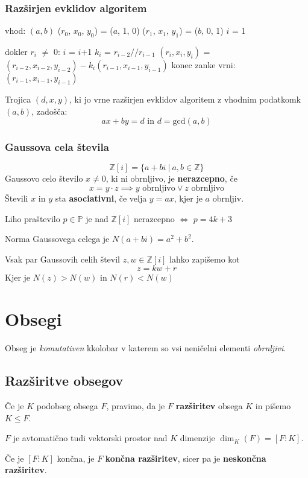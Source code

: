 \subsubsection*{Razširjen evklidov algoritem}
\begin{algorithm}
vhod: $(a, b)$
($r_0$, $x_0$, $y_0$) = ($a$, 1, 0)
($r_1$, $x_1$, $y_1$) = ($b$, 0, 1)
$i$ = 1

dokler $r_i$ $\neq$ 0:
$i$ = $i$+1
$k_i$ = $r_{i-2} // r_{i-1}$
$(r_i, x_i, y_i)$ = $(r_{i-2}, x_{i-2}, y_{i-2}) - k_i(r_{i-1}, x_{i-1}, y_{i-1})$
konec zanke
vrni: $(r_{i-1}, x_{i-1}, y_{i-1})$
\end{algorithm}

Trojica $(d, x, y)$, ki jo vrne razširjen evklidov algoritem z vhodnim podatkomk $(a, b)$, zadošča:
\[ax + by = d \text{ in } d = \textrm{gcd}(a, b)\] 

\subsubsection*{Gaussova cela števila}
\[ \mathbb{Z}[i] = \{a+bi\ |\ a,b \in \mathbb{Z} \}\]
Gaussovo celo število $x \neq 0$, ki ni obrnljivo, je \textbf{nerazcepno}, če
\[ x= y\cdot z \implies y \text{ obrnljivo} \vee z \text{ obrnljivo}\]
Števili $x$ in $y$ sta \textbf{asociativni}, če velja $y = ax$, kjer je $a$ obrnljiv.

Liho praštevilo $p \in \mathbb{P}$ je nad $\mathbb{Z}[i]$ nerazcepno $\iff$ $p = 4k+3$

Norma Gaussovega celega je $N(a+bi) = a^2 + b^2$.

Vsak par Gaussovih celih števil $z, w \in \mathbb{Z}[i]$  lahko zapišemo kot
\[z = kw + r \]
Kjer je $N(z) > N(w)$ in $N(r) < N(w)$

\pagebreak
\section*{Obsegi}
Obseg je \emph{komutativen} kkolobar v katerem so vsi neničelni elementi \emph{obrnljivi}.

\subsection*{Razširitve obsegov}
Če je $K$ podobseg obsega $F$, pravimo, da je $F$ \textbf{razširitev} obsega $K$ in pišemo $K \leq F$.

$F$ je avtomatično tudi vektorski prostor nad $K$ dimenzije $\dim_K(F) = [F:K]$.

Če je $[F:K]$ končna, je $F$ \textbf{končna razširitev}, sicer pa je \textbf{neskončna razširitev}.

